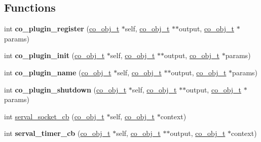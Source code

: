 \subsection*{Functions}
\begin{DoxyCompactItemize}
\item 
\hypertarget{serval-dna_8h_a3bbb939458a3edc82ae0bfe5602967df}{int {\bfseries co\+\_\+plugin\+\_\+register} (\hyperlink{structco__obj__t}{co\+\_\+obj\+\_\+t} $\ast$self, \hyperlink{structco__obj__t}{co\+\_\+obj\+\_\+t} $\ast$$\ast$output, \hyperlink{structco__obj__t}{co\+\_\+obj\+\_\+t} $\ast$params)}\label{serval-dna_8h_a3bbb939458a3edc82ae0bfe5602967df}

\item 
\hypertarget{serval-dna_8h_a0eccb03577be7f0f0e22a4d427f8773f}{int {\bfseries co\+\_\+plugin\+\_\+init} (\hyperlink{structco__obj__t}{co\+\_\+obj\+\_\+t} $\ast$self, \hyperlink{structco__obj__t}{co\+\_\+obj\+\_\+t} $\ast$$\ast$output, \hyperlink{structco__obj__t}{co\+\_\+obj\+\_\+t} $\ast$params)}\label{serval-dna_8h_a0eccb03577be7f0f0e22a4d427f8773f}

\item 
\hypertarget{serval-dna_8h_ab65e09211a66e5e4a54fcb0e963af7fe}{int {\bfseries co\+\_\+plugin\+\_\+name} (\hyperlink{structco__obj__t}{co\+\_\+obj\+\_\+t} $\ast$self, \hyperlink{structco__obj__t}{co\+\_\+obj\+\_\+t} $\ast$$\ast$output, \hyperlink{structco__obj__t}{co\+\_\+obj\+\_\+t} $\ast$params)}\label{serval-dna_8h_ab65e09211a66e5e4a54fcb0e963af7fe}

\item 
\hypertarget{serval-dna_8h_adef3d509f8db4a677d75c4bca5142d8a}{int {\bfseries co\+\_\+plugin\+\_\+shutdown} (\hyperlink{structco__obj__t}{co\+\_\+obj\+\_\+t} $\ast$self, \hyperlink{structco__obj__t}{co\+\_\+obj\+\_\+t} $\ast$$\ast$output, \hyperlink{structco__obj__t}{co\+\_\+obj\+\_\+t} $\ast$params)}\label{serval-dna_8h_adef3d509f8db4a677d75c4bca5142d8a}

\item 
int \hyperlink{serval-dna_8h_a1555be4d16034b506577764fbd2cfb5d}{serval\+\_\+socket\+\_\+cb} (\hyperlink{structco__obj__t}{co\+\_\+obj\+\_\+t} $\ast$self, \hyperlink{structco__obj__t}{co\+\_\+obj\+\_\+t} $\ast$context)
\item 
\hypertarget{serval-dna_8h_a00d4df9eabb0ac594cc118143943392f}{int {\bfseries serval\+\_\+timer\+\_\+cb} (\hyperlink{structco__obj__t}{co\+\_\+obj\+\_\+t} $\ast$self, \hyperlink{structco__obj__t}{co\+\_\+obj\+\_\+t} $\ast$$\ast$output, \hyperlink{structco__obj__t}{co\+\_\+obj\+\_\+t} $\ast$context)}\label{serval-dna_8h_a00d4df9eabb0ac594cc118143943392f}


\end{DoxyCompactItemize}
